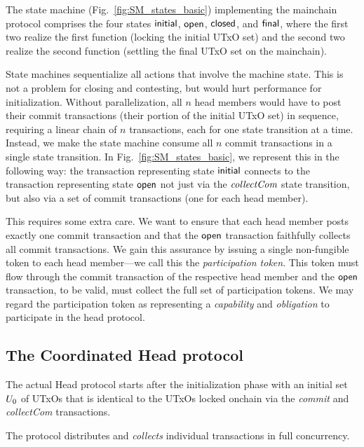 

The state machine (Fig.~\ref{fig:SM_states_basic}) implementing
the mainchain protocol comprises the four states $\mathsf{initial}$,
$\mathsf{open}$, $\mathsf{closed}$, and $\mathsf{final}$, where the first two realize
the first function (locking the initial UTxO set) and the
second two realize the second function (settling the final UTxO set on
the mainchain).

State machines sequentialize all actions that involve the machine state. This is
not a problem for closing and contesting, but would hurt performance for
initialization. Without parallelization, all $n$ head members would have to post
their commit transactions (their portion of the initial UTxO set) in sequence,
requiring a linear chain of $n$
transactions, %
each for one state transition at a time. Instead, we make the state machine
consume all $n$ commit transactions in a single state transition. In
Fig.~\ref{fig:SM_states_basic}, we represent this in the following way: the
transaction representing state $\mathsf{initial}$ connects to the transaction
representing state $\mathsf{open}$ not just via the $\textit{collectCom}$ state transition, but
also via a set of commit transactions (one for each head member).

This requires some extra care. We want to ensure that each
head member posts exactly one commit transaction and that the $\mathsf{open}$
transaction faithfully collects all commit
transactions. We gain this assurance by issuing a single non-fungible
token to each head member---we call this the \emph{participation
  token}.  This token must flow through the commit transaction of the
respective head member and the $\mathsf{open}$ transaction, to be valid, must
collect the full set of participation tokens. We may regard the
participation token as representing a \emph{capability} and
\emph{obligation} to participate in the head protocol.


\subsection{The Coordinated Head protocol}\label{sec:overview_hp}

The actual Head protocol starts after the initialization phase with an initial
set $U_{0}$ of UTxOs that is identical to the UTxOs locked onchain via the
\emph{commit} and \emph{collectCom} transactions.

 The protocol distributes and
\emph{collects} individual transactions in full concurrency.

